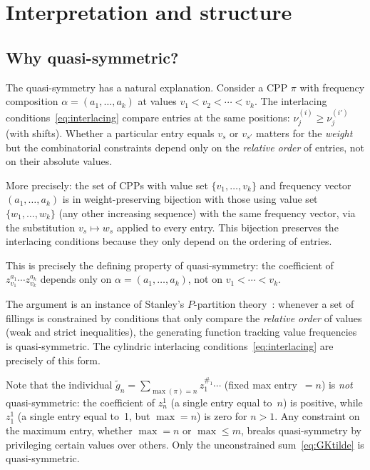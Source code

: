 \documentclass[11pt]{article}
\begin{document}
\section{Interpretation and structure}
\label{sec:interpretation}

\subsection{Why quasi-symmetric?}

The quasi-symmetry has a natural explanation. Consider a CPP
$\pi$ with frequency composition $\alpha = (a_1, \ldots, a_k)$
at values $v_1 < v_2 < \cdots < v_k$. The interlacing
conditions~\eqref{eq:interlacing} compare entries at the same
positions: $\nu^{(i)}_j \geq \nu^{(i')}_j$ (with shifts).
Whether a particular entry equals $v_s$ or $v_{s'}$ matters for
the \emph{weight} but the combinatorial constraints depend only on
the \emph{relative order} of entries, not on their absolute values.

More precisely: the set of CPPs with value set $\{v_1, \ldots, v_k\}$
and frequency vector $(a_1, \ldots, a_k)$ is in weight-preserving
bijection with those using value set $\{w_1, \ldots, w_k\}$
(any other increasing sequence) with the same frequency vector,
via the substitution $v_s \mapsto w_s$ applied to every entry.
This bijection preserves the interlacing conditions because they
only depend on the ordering of entries.

This is precisely the defining property of quasi-symmetry: the
coefficient of $z_{v_1}^{a_1} \cdots z_{v_k}^{a_k}$ depends only
on $\alpha = (a_1, \ldots, a_k)$, not on $v_1 < \cdots < v_k$.

The argument is an instance of Stanley's $P$-partition
theory~\cite{stanley-ordered, gessel-multipartite}:
whenever a set of fillings is constrained by conditions
that only compare the \emph{relative order} of values
(weak and strict inequalities), the generating function
tracking value frequencies is quasi-symmetric.
The cylindric interlacing conditions~\eqref{eq:interlacing}
are precisely of this form.

Note that the individual
$\tilde{g}_n = \sum_{\max(\pi) = n} z_1^{\#_1} \cdots$
(fixed max entry~$= n$) is \emph{not} quasi-symmetric:
the coefficient of $z_n^1$ (a single entry equal to~$n$)
is positive, while $z_1^1$ (a single entry equal to~1, but
$\max = n$) is zero for $n > 1$.
Any constraint on the maximum entry, whether $\max = n$
or $\max \leq m$, breaks quasi-symmetry by privileging
certain values over others. Only the unconstrained
sum~\eqref{eq:GKtilde} is quasi-symmetric.
\end{document}
